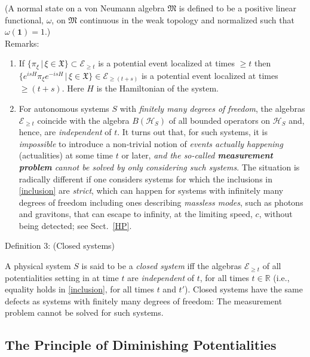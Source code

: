 \documentclass[12pt]{article}
\begin{document}
\noindent
(A normal state on a von Neumann algebra $\mathfrak{M}$ is defined to be a positive linear 
functional, $\omega$, on $\mathfrak{M}$ continuous in the weak topology and normalized such that $\omega(\mathbf{1})=1$.)\\

{Remarks}: 
\begin{enumerate}
\item{If $\big\{ \pi_{\xi}\, \vert \,\xi \in \mathfrak{X} \big\} \subset \mathcal{E}_{\geq t}$ is a potential event localized at times 
$\geq t$ then $\big\{ e^{isH}\pi_{\xi} e^{-isH} \,\vert\, \xi \in \mathfrak{X} \big\} \in \mathcal{E}_{\geq (t+s)} $ is a 
potential event localized at times $\geq (t+s)$. Here $H$ is the Hamiltonian of the system.} 
\item{For autonomous systems $S$ with \textit{finitely many degrees of freedom}, the algebras $\mathcal{E}_{\geq t}$ coincide with 
the algebra $B(\mathcal{H}_S)$ of all bounded operators on $\mathcal{H}_S$ and, hence, are \textit{independent} of $t$. It 
turns out that, for such systems, it is \textit{impossible} to introduce a non-trivial notion of \textit{events actually happening} 
(actualities) at some time $t$ or later, \textit{and the so-called {\bf{measurement problem}} cannot be solved by only considering such systems}. 
The situation is radically different if one considers systems for which the inclusions in \eqref{inclusion} are \textit{strict}, which 
can happen for systems with infinitely many degrees of freedom including ones describing \textit{massless modes}, such as photons and gravitons, 
that can escape to infinity, at the limiting speed, $c$, without being detected; see Sect.~\ref{HP}.}
\end{enumerate}

 {Definition 3}: (Closed systems)
 
 A physical system $S$ is said to be a \textit{closed system} iff the algebras $\mathcal{E}_{\geq t}$ of all potentialities 
 setting in at time $t$ are \textit{independent} of $t$, for all times $t\in \mathbb{R}$ 
 (i.e., equality holds in \eqref{inclusion}, for all times $t$ and $t'$). Closed systems 
 have the same defects as systems with finitely many degrees of freedom: The 
 measurement problem cannot be solved for such systems.
 
 \subsection{The Principle of Diminishing Potentialities}
\end{document}
